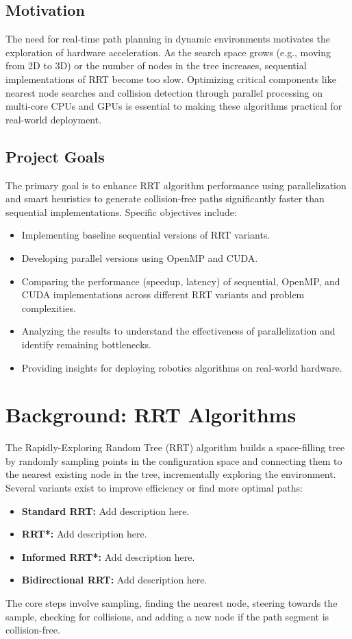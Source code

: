 \documentclass{article}
\begin{document}
\subsection{Motivation}
The need for real-time path planning in dynamic environments motivates the exploration of hardware acceleration. As the search space grows (e.g., moving from 2D to 3D) or the number of nodes in the tree increases, sequential implementations of RRT become too slow. Optimizing critical components like nearest node searches and collision detection through parallel processing on multi-core CPUs and GPUs is essential to making these algorithms practical for real-world deployment.

\subsection{Project Goals}
The primary goal is to enhance RRT algorithm performance using parallelization and smart heuristics to generate collision-free paths significantly faster than sequential implementations. Specific objectives include:
\begin{itemize}
    \item Implementing baseline sequential versions of RRT variants.
    \item Developing parallel versions using OpenMP and CUDA.
    \item Comparing the performance (speedup, latency) of sequential, OpenMP, and CUDA implementations across different RRT variants and problem complexities.
    \item Analyzing the results to understand the effectiveness of parallelization and identify remaining bottlenecks.
    \item Providing insights for deploying robotics algorithms on real-world hardware.
\end{itemize}

\section{Background: RRT Algorithms}

The Rapidly-Exploring Random Tree (RRT) algorithm builds a space-filling tree by randomly sampling points in the configuration space and connecting them to the nearest existing node in the tree, incrementally exploring the environment. Several variants exist to improve efficiency or find more optimal paths:
\begin{itemize}
    \item \textbf{Standard RRT:} Add description here.
    \item \textbf{RRT*:} Add description here.
    \item \textbf{Informed RRT*:} Add description here.
    \item \textbf{Bidirectional RRT:} Add description here.
\end{itemize}
The core steps involve sampling, finding the nearest node, steering towards the sample, checking for collisions, and adding a new node if the path segment is collision-free.
\end{document}
